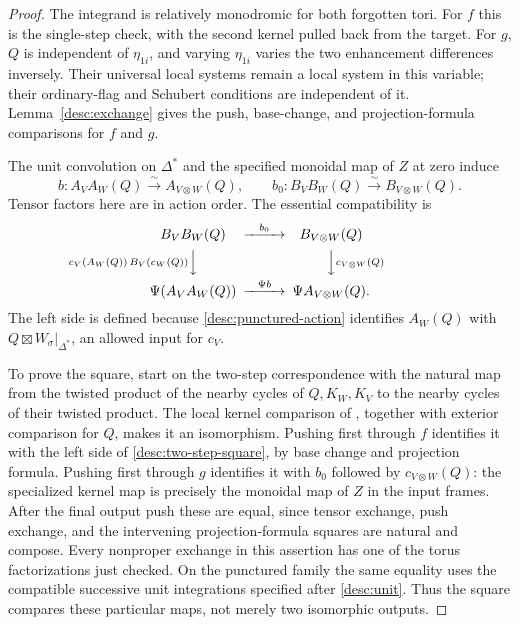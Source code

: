 \begin{proof}
The integrand is relatively monodromic for both forgotten tori.
For $f$ this is the single-step check, with the second kernel pulled
back from the target.  For $g$, $Q$ is independent of $\eta_{1i}$,
and varying $\eta_{1i}$ varies the two enhancement differences
inversely.  Their universal local systems remain a local system in
this variable; their ordinary-flag and Schubert conditions are
independent of it.  Lemma~\ref{desc:exchange} gives the push,
base-change, and projection-formula comparisons for $f$ and $g$.

The unit convolution on $\Delta^*$ and the specified monoidal map
of $Z$ at zero induce
\[
 b:A_VA_W(Q)\xrightarrow{\sim}A_{V\otimes W}(Q),\qquad
 b_0:B_VB_W(Q)\xrightarrow{\sim}B_{V\otimes W}(Q).
\]
Tensor factors here are in action order.  The essential compatibility
is
\begin{equation}\label{desc:two-step-square}
\begin{CD}
 B_VB_W(Q) @>{b_0}>> B_{V\otimes W}(Q)\\
 @V{c_V(A_W(Q))\,B_V(c_W(Q))}VV
                 @VV{c_{V\otimes W}(Q)}V\\
 \Psi(A_VA_W(Q)) @>{\Psi b}>>\Psi A_{V\otimes W}(Q).
\end{CD}
\end{equation}
The left side is defined because \eqref{desc:punctured-action}
identifies $A_W(Q)$ with $Q\boxtimes W_\sigma|_{\Delta^*}$, an
allowed input for $c_V$.

To prove the square, start on the two-step correspondence with the
natural map from the twisted product of the nearby cycles of
$Q,K_W,K_V$ to the nearby cycles of their twisted product.
The local kernel comparison of \cite[Lemma~6.3.2]{DT}, together
with exterior comparison for $Q$, makes it an isomorphism.
Pushing first through $f$ identifies it with the left side of
\eqref{desc:two-step-square}, by base change and projection formula.
Pushing first through $g$ identifies it with $b_0$ followed by
$c_{V\otimes W}(Q)$: the specialized kernel map is precisely the
monoidal map of $Z$ in the input frames.  After the final output
push these are equal, since tensor exchange, push exchange, and
the intervening projection-formula squares are natural and compose.
Every nonproper exchange in this assertion has one of the torus
factorizations just checked.  On the punctured family the same
equality uses the compatible successive unit integrations specified
after \eqref{desc:unit}.  Thus the square compares these particular
maps, not merely two isomorphic outputs.


\end{proof}
